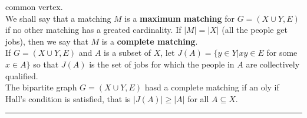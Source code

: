 \documentclass[10pt,landscape]{article}
\begin{document}
\begin{multicols}{4}
common vertex.\\
We shall say that a matching $M$ is a \textbf{maximum matching} for $G
=(X \cup Y,E)$ if no other matching has a greated cardinality. If $|M|
= |X|$ (all the people get jobs), then we say that $M$ is a
\textbf{complete matching}.\\
If $G = (X \cup Y, E)$ and $A$ is a subset of $X$, let $J(A) = \{y \in
Y | xy \in E$ for some $x \in A\}$ so that $J(A)$ is the set of jobs
for which the people in $A$ are collectively qualified.\\
The bipartite graph $G = (X \cup Y, E)$ hasd a complete matching if an
oly if Hall's condition is satisfied, that is $|J(A)| \geq |A|$ for
all $A \subseteq X$.\\ 




\rule{0.3\linewidth}{0.25pt}
\scriptsize


\end{multicols}
\end{document}
